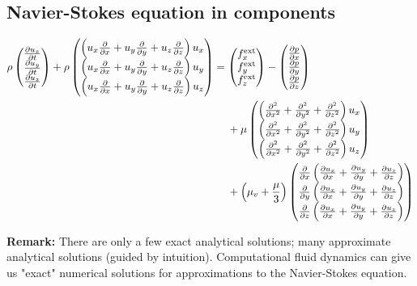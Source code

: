 \subsection{Navier-Stokes equation in components}
\begin{align}
\begin{split}\rho
\begin{pmatrix}
\frac{\partial u_x}{\partial t} \\ \frac{\partial u_y}{\partial t} \\ \frac{\partial u_z}{\partial t}
\end{pmatrix} +
\rho
\begin{pmatrix}
\left(u_x\frac{\partial }{\partial x}+u_y\frac{\partial }{\partial y}+u_z\frac{\partial }{\partial z}\right)u_x \\
\left(u_x\frac{\partial }{\partial x}+u_y\frac{\partial }{\partial y}+u_z\frac{\partial }{\partial z}\right)u_y \\
\left(u_x\frac{\partial }{\partial x}+u_y\frac{\partial }{\partial y}+u_z\frac{\partial }{\partial z}\right)u_z
\end{pmatrix} &= 
\begin{pmatrix}
f_x^\mathrm{ext} \\ f_y^\mathrm{ext} \\ f_z^\mathrm{ext}
\end{pmatrix} -
\begin{pmatrix}
\frac{\partial p}{\partial x} \\ \frac{\partial p}{\partial y} \\ \frac{\partial p}{\partial z}
\end{pmatrix} \\
&\hspace{4.5mm}+
\mu
\begin{pmatrix}
\left(\frac{\partial^2 }{\partial x^2}+\frac{\partial^2 }{\partial y^2}+\frac{\partial^2 }{\partial z^2}\right)u_x \\
\left(\frac{\partial^2 }{\partial x^2}+\frac{\partial^2 }{\partial y^2}+\frac{\partial^2 }{\partial z^2}\right)u_y \\
\left(\frac{\partial^2 }{\partial x^2}+\frac{\partial^2 }{\partial y^2}+\frac{\partial^2 }{\partial z^2}\right)u_z
\end{pmatrix} \\
&\hspace{4.5mm}+
\left(\mu_v + \frac{\mu}{3}\right)
\begin{pmatrix}
\frac{\partial }{\partial x}\left(\frac{\partial u_x}{\partial x}+\frac{\partial u_y}{\partial y}+\frac{\partial u_z}{\partial z}\right) \\
\frac{\partial }{\partial y}\left(\frac{\partial u_x}{\partial x}+\frac{\partial u_y}{\partial y}+\frac{\partial u_z}{\partial z}\right) \\
\frac{\partial }{\partial z}\left(\frac{\partial u_x}{\partial x}+\frac{\partial u_y}{\partial y}+\frac{\partial u_z}{\partial z}\right)
\end{pmatrix}
\end{split}
\end{align}

\begin{framed}
\textbf{Remark:} There are only a few exact analytical solutions; many approximate analytical solutions (guided by intuition). Computational fluid dynamics can give us "exact" numerical solutions for approximations to the Navier-Stokes equation.
\end{framed}

